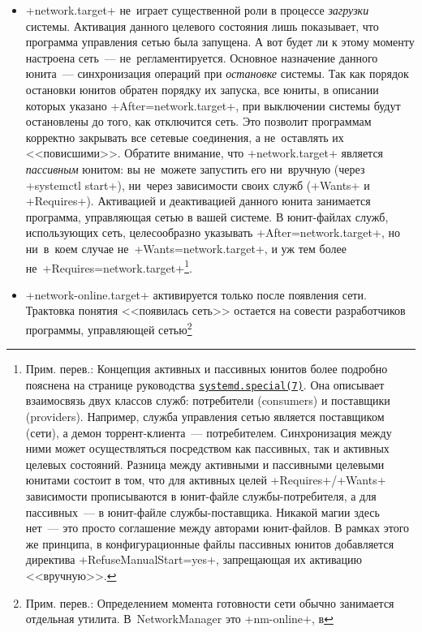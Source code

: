\documentclass[10pt,oneside,a4paper]{article}
\newcommand{\hreftt}[2]{\href{#1}{\texttt{#2}}}
\begin{document}
\begin{itemize}
	\item +network.target+ не~играет существенной роли в процессе
		\emph{загрузки} системы. Активация данного целевого состояния
		лишь показывает, что программа управления сетью была запущена.
		А вот будет ли к этому моменту настроена сеть~---
		не~регламентируется. Основное назначение данного юнита~---
		синхронизация операций при \emph{остановке} системы. Так как
		порядок остановки юнитов обратен порядку их запуска, все юниты,
		в описании которых указано +After=network.target+, при
		выключении системы будут остановлены до того, как отключится
		сеть. Это позволит программам корректно закрывать все сетевые
		соединения, а не~оставлять их <<повисшими>>. Обратите внимание,
		что +network.target+ является \emph{пассивным} юнитом: вы
		не~можете запустить его ни~вручную (через +systemctl start+),
		ни~через зависимости своих служб (+Wants+ и +Requires+).
		Активацией и деактивацией данного юнита занимается программа,
		управляющая сетью в вашей системе. В юнит-файлах служб,
		использующих сеть, целесообразно указывать
		+After=network.target+, но ни~в~коем случае
		не~+Wants=network.target+, и уж тем более
		не~+Requires=network.target+\footnote{Прим. перев.: Концепция
		активных и пассивных юнитов более подробно пояснена на странице
		руководства
		\hreftt{http://www.freedesktop.org/software/systemd/man/systemd.special.html}{systemd.special(7)}.
		Она описывает взаимосвязь двух классов служб: потребители
		(consumers) и поставщики (providers). Например, служба
		управления сетью является поставщиком (сети), а демон
		торрент-клиента~--- потребителем. Синхронизация между ними может
		осуществляться посредством как пассивных, так и активных целевых
		состояний. Разница между активными и пассивными целевыми
		юнитами состоит в том, что для активных целей 
		+Requires+/+Wants+ зависимости прописываются в юнит-файле
		службы-потребителя, а для пассивных~--- в юнит-файле
		службы-поставщика. Никакой магии здесь нет~--- это
		просто соглашение между авторами юнит-файлов. В рамках этого же
		принципа, в конфигурационные файлы пассивных юнитов
		добавляется директива +RefuseManualStart=yes+, запрещающая их
		активацию <<вручную>>.}.
	\item +network-online.target+ активируется только после появления сети.
		Трактовка понятия <<появилась сеть>> остается на совести
		разработчиков программы, управляющей сетью\footnote{Прим.
		перев.: Определением момента готовности сети обычно занимается
		отдельная утилита. В~NetworkManager это +nm-online+, в
}
\end{itemize}
\end{document}
